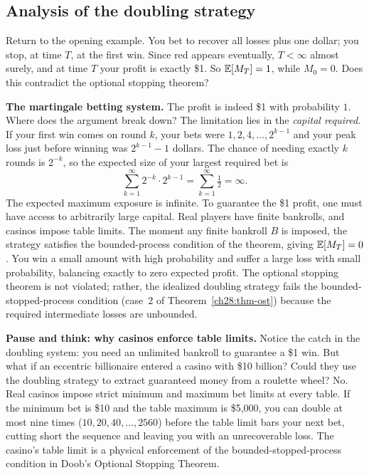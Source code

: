 \subsection{Analysis of the doubling strategy}

Return to the opening example. You bet to recover all losses plus one dollar; you stop, at time $T$, at
the first win. Since red appears eventually, $T < \infty$ almost surely, and at time $T$ your profit is
exactly \$1. So $\operatorname{\mathbb{E}}[M_T] = 1$, while $M_0 = 0$. Does this contradict the optional stopping theorem?

\begin{paradoxbox}
\textbf{The martingale betting system.} The profit is indeed \$1 with probability $1$. Where does the argument break down?
The limitation lies in the \emph{capital required}. If your first win comes on round $k$, your bets were
$1, 2, 4, \dots, 2^{k-1}$ and your peak loss just before winning was $2^{k-1} - 1$ dollars. The chance
of needing exactly $k$ rounds is $2^{-k}$, so the expected size of your largest required bet is
\[
  \sum_{k=1}^{\infty} 2^{-k}\cdot 2^{k-1} = \sum_{k=1}^{\infty}\tfrac12 = \infty.
\]
The expected maximum exposure is infinite. To guarantee the \$1 profit, one must have access
to arbitrarily large capital. Real players have finite bankrolls, and casinos impose table limits.
The moment any finite bankroll $B$ is imposed, the strategy satisfies the bounded-process condition
of the theorem, giving $\operatorname{\mathbb{E}}[M_T] = 0$. You win a small amount with high probability and suffer a large
loss with small probability, balancing exactly to zero expected profit. The optional stopping theorem
is not violated; rather, the idealized doubling strategy fails the bounded-stopped-process condition
(case~2 of Theorem~\ref{ch28:thm-ost}) because the required intermediate losses are unbounded.
\end{paradoxbox}

\begin{walkbox}
\textbf{Pause and think: why casinos enforce table limits.}
Notice the catch in the doubling system: you need an unlimited bankroll to guarantee a \$1 win. But
what if an eccentric billionaire entered a casino with \$10 billion? Could they use the doubling
strategy to extract guaranteed money from a roulette wheel?
No. Real casinos impose strict minimum and maximum bet limits at every table. If the minimum bet is
\$10 and the table maximum is \$5{,}000, you can double at most nine times ($10, 20, 40, \dots, 2560$)
before the table limit bars your next bet, cutting short the sequence and leaving you with an
unrecoverable loss. The casino's table limit is a physical enforcement of the bounded-stopped-process
condition in Doob's Optional Stopping Theorem.
\end{walkbox}

